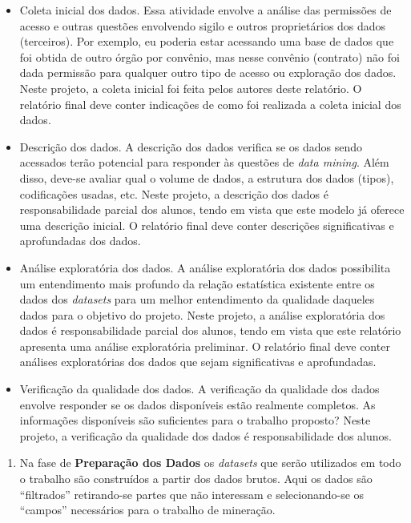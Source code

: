 \documentclass[]{article}
\providecommand{\tightlist}{%
  \setlength{\itemsep}{0pt}\setlength{\parskip}{0pt}}
\begin{document}
\begin{itemize}
\item
  Coleta inicial dos dados. Essa atividade envolve a análise das
  permissões de acesso e outras questões envolvendo sigilo e outros
  proprietários dos dados (terceiros). Por exemplo, eu poderia estar
  acessando uma base de dados que foi obtida de outro órgão por
  convênio, mas nesse convênio (contrato) não foi dada permissão para
  qualquer outro tipo de acesso ou exploração dos dados. Neste projeto,
  a coleta inicial foi feita pelos autores deste relatório. O relatório
  final deve conter indicações de como foi realizada a coleta inicial
  dos dados.
\item
  Descrição dos dados. A descrição dos dados verifica se os dados sendo
  acessados terão potencial para responder às questões de \emph{data
  mining}. Além disso, deve-se avaliar qual o volume de dados, a
  estrutura dos dados (tipos), codificações usadas, etc. Neste projeto,
  a descrição dos dados é responsabilidade parcial dos alunos, tendo em
  vista que este modelo já oferece uma descrição inicial. O relatório
  final deve conter descrições significativas e aprofundadas dos dados.
\item
  Análise exploratória dos dados. A análise exploratória dos dados
  possibilita um entendimento mais profundo da relação estatística
  existente entre os dados dos \emph{datasets} para um melhor
  entendimento da qualidade daqueles dados para o objetivo do projeto.
  Neste projeto, a análise exploratória dos dados é responsabilidade
  parcial dos alunos, tendo em vista que este relatório apresenta uma
  análise exploratória preliminar. O relatório final deve conter
  análises exploratórias dos dados que sejam significativas e
  aprofundadas.
\item
  Verificação da qualidade dos dados. A verificação da qualidade dos
  dados envolve responder se os dados disponíveis estão realmente
  completos. As informações disponíveis são suficientes para o trabalho
  proposto? Neste projeto, a verificação da qualidade dos dados é
  responsabilidade dos alunos.
\end{itemize}

\begin{enumerate}
\def\labelenumi{\arabic{enumi}.}
\setcounter{enumi}{2}
\tightlist
\item
  Na fase de \textbf{Preparação dos Dados} os \emph{datasets} que serão
  utilizados em todo o trabalho são construídos a partir dos dados
  brutos. Aqui os dados são ``filtrados'' retirando-se partes que não
  interessam e selecionando-se os ``campos'' necessários para o trabalho
  de mineração.
\end{enumerate}
\end{document}
